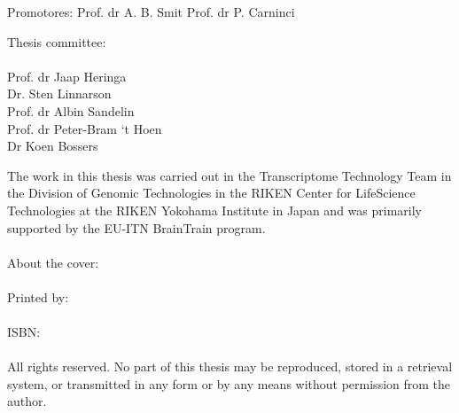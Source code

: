 \fontsize{13}{1.5em}\selectfont

\noindent
Promotores:
\tabto{3cm} Prof. dr A. B. Smit
\tabto{3cm} Prof. dr P. Carninci

\newpage

{  
   \setlength{\parindent}{0cm}
   Thesis committee:
   \\
   \\
   Prof. dr Jaap Heringa \\
   Dr. Sten Linnarson \\
   Prof. dr Albin Sandelin \\
   Prof. dr Peter-Bram `t Hoen \\
   Dr Koen Bossers \\
}

\newpage

\normalsize
{  
   \setlength{\parindent}{0cm}
   The work in this thesis was carried out in the Transcriptome Technology Team in the Division of Genomic Technologies in the RIKEN Center for LifeScience Technologies at the RIKEN Yokohama Institute in Japan and was primarily supported by the EU-ITN BrainTrain program.
   \\
   \\
   About the cover:
   \\
   \\
   Printed by:
   \\
   \\
   ISBN:
   \\
   \\
   All rights reserved. No part of this thesis may be reproduced, stored in a retrieval system, or transmitted in any form or by any means without permission from the author.
}
